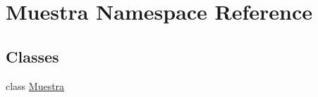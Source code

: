\hypertarget{namespace_muestra}{}\section{Muestra Namespace Reference}
\label{namespace_muestra}
\subsection*{Classes}
\begin{DoxyCompactItemize}
\item 
class \mbox{\hyperlink{class_muestra_1_1_muestra}{Muestra}}
\end{DoxyCompactItemize}
